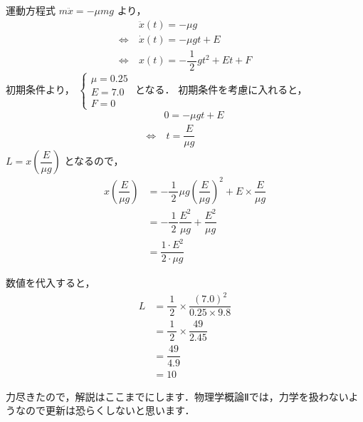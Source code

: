 \documentclass[a4paper,11pt]{ltjsarticle}
\begin{document}
\begin{enumerate}
    運動方程式 $m \ddot{x}=-\mu mg$ より，
    \begin{equation*}
      \begin{aligned}
        &\ \ddot{x}(t) = - \mu g \\
        \Leftrightarrow &\ \dot{x}(t) = - \mu gt + E \\
        \Leftrightarrow &\ x(t) = -\dfrac{1}{\ 2\ }gt^{2}+Et+F
      \end{aligned}
    \end{equation*}
    初期条件より，
    $
    \begin{cases}
      \mu = 0.25 \\
      E = 7.0 \\
      F = 0
    \end{cases}
    $
    となる．
    初期条件を考慮に入れると，
    \begin{equation*}
      \begin{aligned}
        & 0= - \mu gt + E \\
        \Leftrightarrow &\ t= \dfrac{E}{\mu g}
      \end{aligned}
    \end{equation*}
    $L = x \left(\dfrac{E}{\mu g}\right)$ となるので，
    \begin{equation*}
      \begin{aligned}
        x \left(\dfrac{E}{\mu g}\right) &= -\dfrac{1}{\ 2\ } \mu g \left(\dfrac{E}{\mu g}\right)^{2} + E \times \dfrac{E}{\mu g} \\
                                        &= -\dfrac{1}{\ 2\ } \dfrac{E^{2}}{\mu g} + \dfrac{E^{2}}{\mu g} \\
                                        &= \dfrac{1 \cdot E^{2}}{2 \cdot \mu g}
      \end{aligned}
    \end{equation*}

\clearpage

    数値を代入すると，
    \begin{equation*}
      \begin{aligned}
        L &= \dfrac{1}{\ 2\ } \times \dfrac{(7.0)^2}{0.25 \times 9.8} \\
          &= \dfrac{1}{\ 2\ } \times \dfrac{49}{2.45} \\
          &= \dfrac{49}{4.9} \\
          &= 10
      \end{aligned}
    \end{equation*}

\end{enumerate}

力尽きたので，解説はここまでにします．物理学概論Ⅱでは，力学を扱わないようなので更新は恐らくしないと思います．
\end{document}
